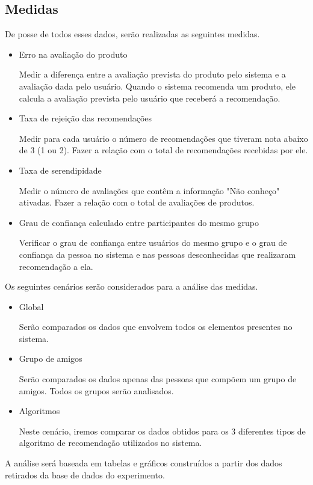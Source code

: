 \subsection{Medidas}

De posse de todos esses dados, serão realizadas as seguintes medidas.

\begin{itemize}

\item Erro na avaliação do produto

 Medir a diferença entre a avaliação prevista do produto pelo sistema e a avaliação dada pelo usuário. Quando o sistema recomenda um produto, ele calcula a avaliação prevista pelo usuário que receberá a recomendação.

\item Taxa de rejeição das recomendações
		
 Medir para cada usuário o número de recomendações que tiveram nota abaixo de 3 (1 ou 2). Fazer a relação com o total de recomendações recebidas por ele.

\item Taxa de serendipidade

 Medir o número de avaliações que contêm a informação "Não conheço" ativadas. Fazer a relação com o total de avaliações de produtos.

\item Grau de confiança calculado entre participantes do mesmo grupo

 Verificar o grau de confiança entre usuários do mesmo grupo e o grau de confiança da pessoa no sistema e nas pessoas desconhecidas que realizaram recomendação a ela.
\end{itemize}

 Os seguintes cenários serão considerados para a análise das medidas.

\begin{itemize}

\item Global

 Serão comparados os dados que envolvem todos os elementos presentes no sistema.

\item Grupo de amigos

 Serão comparados os dados apenas das pessoas que compõem um grupo de amigos. Todos os grupos serão analisados.

\item Algoritmos

 Neste cenário, iremos comparar os dados obtidos para os 3 diferentes tipos de algoritmo de recomendação utilizados no sistema.

\end{itemize}

 A análise será baseada em tabelas e gráficos construídos a partir dos dados retirados da base de dados do experimento.

